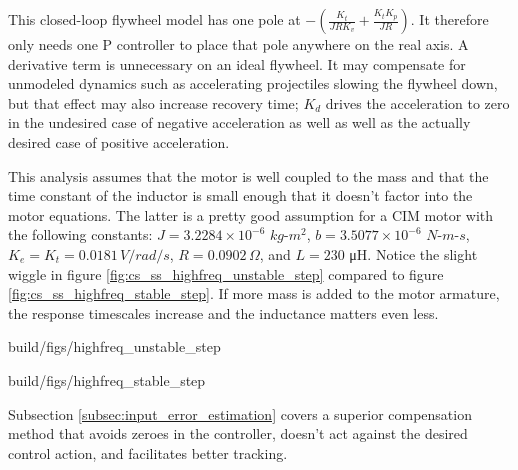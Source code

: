 This closed-loop flywheel model has one pole at
$-\left(\frac{K_t}{JRK_v} + \frac{K_t K_p}{JR}\right)$. It therefore only needs
one P controller to place that pole anywhere on the real axis. A derivative
term is unnecessary on an ideal flywheel. It may compensate for unmodeled
dynamics such as accelerating projectiles slowing the flywheel down, but that
effect may also increase recovery time; $K_d$ drives the acceleration to zero in
the undesired case of negative acceleration as well as well as the actually
desired case of positive acceleration.

This analysis assumes that the motor is well coupled to the mass and that the
time constant of the inductor is small enough that it doesn't factor into the
motor equations. The latter is a pretty good assumption for a CIM motor with the
following constants: $J = 3.2284 \times 10^{-6}$ $kg$-$m^2$,
$b = 3.5077 \times 10^{-6}$ $N$-$m$-$s$, $K_e = K_t = 0.0181 \,V/rad/s$,
$R = 0.0902 \,\Omega$, and $L = 230$ μH. Notice the slight wiggle in figure
\ref{fig:cs_ss_highfreq_unstable_step} compared to figure
\ref{fig:cs_ss_highfreq_stable_step}. If more mass is added to the motor
armature, the response timescales increase and the inductance matters even less.
\begin{bookfigure}
  \begin{minisvg}{2}{build/figs/highfreq_unstable_step}
    \caption{Step response of second-order DC brushed motor plant augmented with
      position ($L = 230$ μH)}
    \label{fig:cs_ss_highfreq_unstable_step}
  \end{minisvg}
  \hfill
  \begin{minisvg}{2}{build/figs/highfreq_stable_step}
    \caption{Step response of first-order DC brushed motor plant augmented with
      position ($L = 0$ μH)}
    \label{fig:cs_ss_highfreq_stable_step}
  \end{minisvg}
\end{bookfigure}

Subsection \ref{subsec:input_error_estimation} covers a superior compensation
method that avoids zeroes in the \gls{controller}, doesn't act against the
desired control action, and facilitates better \gls{tracking}.
